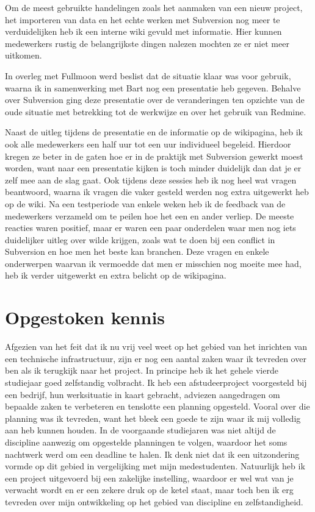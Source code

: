 Om de meest gebruikte handelingen zoals het aanmaken van een nieuw project, het importeren van data en het echte werken met Subversion nog meer te verduidelijken heb ik een interne wiki gevuld met informatie. Hier kunnen medewerkers rustig de belangrijkste dingen nalezen mochten ze er niet meer uitkomen.

In overleg met Fullmoon werd beslist dat de situatie klaar was voor gebruik, waarna ik in samenwerking met Bart nog een presentatie heb gegeven. Behalve over Subversion ging deze presentatie over de veranderingen ten opzichte van de oude situatie met betrekking tot de werkwijze en over het gebruik van Redmine.

Naast de uitleg tijdens de presentatie en de informatie op de wikipagina, heb ik ook alle medewerkers een half uur tot een uur individueel begeleid. Hierdoor kregen ze beter in de gaten hoe er in de praktijk met Subversion gewerkt moest worden, want naar een presentatie kijken is toch minder duidelijk dan dat je er zelf mee aan de slag gaat. Ook tijdens deze sessies heb ik nog heel wat vragen beantwoord, waarna ik vragen die vaker gesteld werden nog extra uitgewerkt heb op de wiki. Na een testperiode van enkele weken heb ik de feedback van de medewerkers verzameld om te peilen hoe het een en ander verliep. De meeste reacties waren positief, maar er waren een paar onderdelen waar men nog iets duidelijker uitleg over wilde krijgen, zoals wat te doen bij een conflict in Subversion en hoe men het beste kan branchen. Deze vragen en enkele onderwerpen waarvan ik vermoedde dat men er misschien nog moeite mee had, heb ik verder uitgewerkt en extra belicht op de wikipagina.

\section{Opgestoken kennis}

Afgezien van het feit dat ik nu vrij veel weet op het gebied van het inrichten van een technische infrastructuur, zijn er nog een aantal zaken waar ik tevreden over ben als ik terugkijk naar het project. In principe heb ik het gehele vierde studiejaar goed zelfstandig volbracht. Ik heb een afstudeerproject voorgesteld bij een bedrijf, hun werksituatie in kaart gebracht, adviezen aangedragen om bepaalde zaken te verbeteren en tenslotte een planning opgesteld. Vooral over die planning was ik tevreden, want het bleek een goede te zijn waar ik mij volledig aan heb kunnen houden. In de voorgaande studiejaren was niet altijd de discipline aanwezig om opgestelde planningen te volgen, waardoor het soms nachtwerk werd om een deadline te halen. Ik denk niet dat ik een uitzondering vormde op dit gebied in vergelijking met mijn medestudenten. Natuurlijk heb ik een project uitgevoerd bij een zakelijke instelling, waardoor er wel wat van je verwacht wordt en er een zekere druk op de ketel staat, maar toch ben ik erg tevreden over mijn ontwikkeling op het gebied van discipline en zelfstandigheid.

